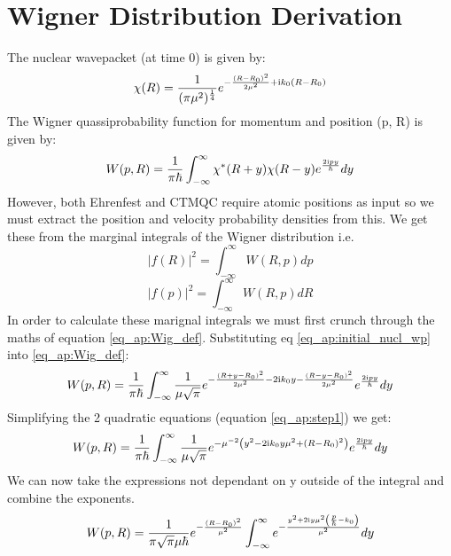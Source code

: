 \chapter{Wigner Distribution Derivation}
\label{ap:Wigner}
The nuclear wavepacket (at time 0) is given by:
\begin{equation}
  \chi(R) = \frac{1}{(\pi \mu^2)^{\frac{1}{4}}} e^{-\frac{(R - R_0)^2}{2 \mu^2} + \mathrm{i} k_0 (R - R_0) }
  \label{eq_ap:initial_nucl_wp}
\end{equation}
The Wigner quassiprobability function for momentum and position (p, R) is given by:
\begin{equation}
  W(p, R) = \frac{1}{\pi \hbar} \int_{-\infty}^{\infty} \chi^{*}(R + y) \chi(R -y) e^{\frac{2 \mathrm{i} p y}{\hbar}} dy
  \label{eq_ap:Wig_def}
\end{equation}
However, both Ehrenfest and CTMQC require atomic positions as input so we must extract the position and velocity probability densities from this. We get these from the marginal integrals of the Wigner distribution i.e.
\begin{equation}
  \vert f(R)\vert^2 = \int^{\infty}_{-\infty} W(R, p) dp
\end{equation}
\begin{equation}
  \vert f(p)\vert^2 = \int^{\infty}_{-\infty} W(R, p) dR
\end{equation}
In order to calculate these marignal integrals we must first crunch through the maths of equation \eqref{eq_ap:Wig_def}. Substituting eq \eqref{eq_ap:initial_nucl_wp} into \eqref{eq_ap:Wig_def}:
\begin{equation}
  W(p, R) = \frac{1}{\pi \hbar} \int_{-\infty}^{\infty} \frac{1}{\mu \sqrt{\pi}} e^{- \frac{(R + y - R_0)^2}{2 \mu^2} - 2\mathrm{i} k_0y - \frac{(R - y - R_0)^2}{2 \mu^2} } e^{\frac{2 \mathrm{i} p y}{\hbar}} dy
  \label{eq_ap:step1}
\end{equation}
Simplifying the 2 quadratic equations (equation \eqref{eq_ap:step1}) we get:
\begin{equation}
  W(p, R) = \frac{1}{\pi \hbar} \int_{-\infty}^{\infty} \frac{1}{\mu \sqrt{\pi}} e^{-\mu^{-2} \left(y^2 - 2\mathrm{i} k_0y \mu^2 + (R - R_0)^2 \right) } e^{\frac{2 \mathrm{i} p y}{\hbar}} dy
  \label{eq_ap:step2}
\end{equation}
We can now take the expressions not dependant on y outside of the integral and combine the exponents.
\begin{equation}
  W(p, R) = \frac{1}{\pi \sqrt{\pi} \mu \hbar} e^{-\frac{(R - R_0)^2}{\mu^2}} \int_{-\infty}^{\infty} e^{-\frac{y^2 + 2 \mathrm{i} y\mu^{2}\left( \frac{p}{\hbar} - k_0\right)}{\mu^{2}}  } dy
  \label{eq_ap:step3}
\end{equation}
